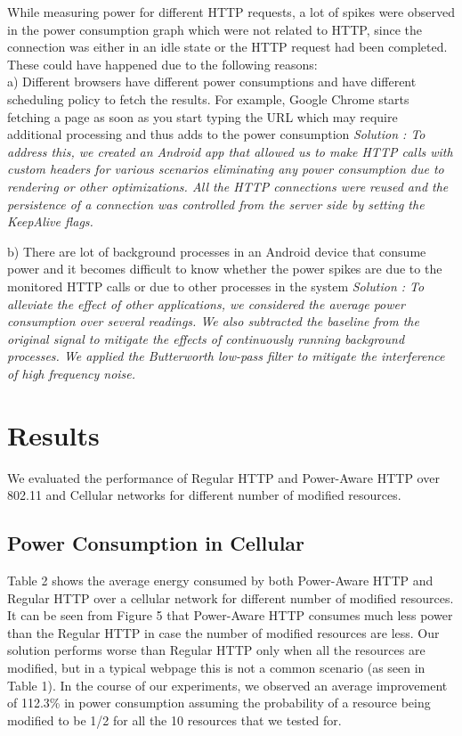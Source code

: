 \documentclass{sigplanconf}
\begin{document}
While measuring power for different HTTP requests, a lot of spikes were observed in the power consumption graph which were not related to HTTP, since the connection was either in an idle state or the HTTP request had been completed. These could have happened due to the following reasons: \\
a) Different browsers have different power consumptions and have different scheduling policy to fetch the results. For example, Google Chrome starts fetching a page as soon as you start typing the URL which may require additional processing and thus adds to the power consumption\newline
\it{Solution} \rm: To address this, we created an Android app that allowed us to make HTTP calls with custom headers for various scenarios eliminating any power consumption due to rendering or other optimizations. All the HTTP connections were reused and the persistence of a connection was controlled from the server side by setting the KeepAlive flags.

b) There are lot of background processes in an Android device that consume power and it becomes difficult to know whether the power spikes are due to the monitored HTTP calls or due to other processes in the system\newline
\it{Solution} \rm: To alleviate the effect of other applications, we considered the average power consumption over several readings. We also subtracted the baseline from the original signal to mitigate the effects of continuously running background processes. We applied the Butterworth low-pass filter to mitigate the interference of high frequency noise.

\section{Results}
We evaluated the performance of Regular HTTP and Power-Aware HTTP over 802.11 and Cellular networks for different number of modified resources.  

\subsection{Power Consumption in Cellular}
Table 2 shows the average energy consumed by both Power-Aware HTTP and Regular HTTP over a cellular network for different number of modified resources. It can be seen from Figure 5 that Power-Aware HTTP consumes much less power than the Regular HTTP in case the number of modified resources are less. Our solution performs worse than Regular HTTP only when all the resources are modified, but in a typical webpage this is not a common scenario (as seen in Table 1). In the course of our experiments, we observed an average improvement of 112.3\% in power consumption assuming the probability of a resource being modified to be 1/2 for all the 10 resources that we tested for.
\end{document}
